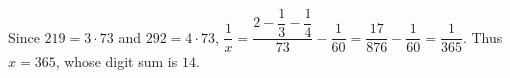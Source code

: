 Since $219=3\cdot73$ and $292=4\cdot73$, $\dfrac{1}{x}=\dfrac{2-\dfrac{1}{3}-\dfrac{1}{4}}{73}-\dfrac{1}{60}=\dfrac{17}{876}-\dfrac{1}{60}=\dfrac{1}{365}$. Thus $x=365$, whose digit sum is $\boxed{14}$.
